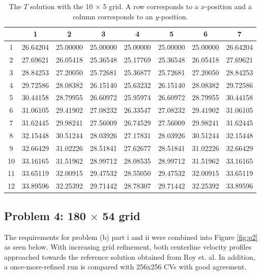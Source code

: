 \documentclass{article}
\begin{document}
\def\arraystretch{1.3}
\begin{table}[H]
	\scriptsize
	\centering
	\caption{The $T$ solution with the 10 $\times$ 5 grid. A row corresponds to a $x$-position and a column corresponds to an $y$-position.}
	\vspace{0.2cm}
	\begin{tabular}{c|S|S|S|S|S|S|S}
		& {1} & {2} & {3} & {4} & {5} & {6} & {7} \\
		 & 26.64204 & 25.00000 & 25.00000 & 25.00000 & 25.00000 & 25.00000 & 26.64204 \\
        2 & 27.69621 & 26.05418 & 25.36548 & 25.17769 & 25.36548 & 26.05418 & 27.69621 \\
        3 & 28.84253 & 27.20050 & 25.72681 & 25.36877 & 25.72681 & 27.20050 & 28.84253 \\
        4 & 29.72586 & 28.08382 & 26.15140 & 25.63232 & 26.15140 & 28.08382 & 29.72586 \\
        5 & 30.44158 & 28.79955 & 26.60972 & 25.95974 & 26.60972 & 28.79955 & 30.44158 \\
        6 & 31.06105 & 29.41902 & 27.08232 & 26.33547 & 27.08232 & 29.41902 & 31.06105 \\
        7 & 31.62445 & 29.98241 & 27.56009 & 26.74529 & 27.56009 & 29.98241 & 31.62445 \\
        8 & 32.15448 & 30.51244 & 28.03926 & 27.17831 & 28.03926 & 30.51244 & 32.15448 \\
        9 & 32.66429 & 31.02226 & 28.51841 & 27.62677 & 28.51841 & 31.02226 & 32.66429 \\
        10 & 33.16165 & 31.51962 & 28.99712 & 28.08535 & 28.99712 & 31.51962 & 33.16165 \\
        11 & 33.65119 & 32.00915 & 29.47532 & 28.55050 & 29.47532 & 32.00915 & 33.65119 \\
        12 & 33.89596 & 32.25392 & 29.71442 & 28.78307 & 29.71442 & 32.25392 & 33.89596 \\
	\end{tabular}
	\label{table:coarse-T}
\end{table}

\subsection{Problem 4: 180 $\times$ 54 grid}

The requirements for problem (b) part i and ii were combined into Figure \ref{fig:p2} as seen below. With increasing grid refinement, both centerline velocity profiles approached towards the reference solution obtained from Roy et. al. In addition, a once-more-refined run is compared with 256x256 CVs with good agreement.
\end{document}
